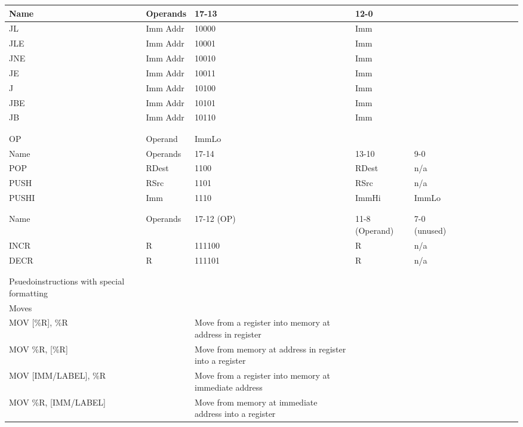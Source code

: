 \documentclass[a4paper]{article}
\begin{document}
\begin{tabular}{|l|l|l|l|l|l|l|l|l|l|l|l|}
\hline
Name&Operands&17-13&12-0&&&&&&
&&\\
\hline
{} JL&Imm Addr&10000&Imm&&&&&&
&&\\
\hline
JLE&Imm Addr&10001&Imm&&&&&&
&&\\
\hline
{} JNE&Imm Addr&10010&Imm&&&&&&
&&\\
\hline
JE&Imm Addr&10011&Imm&&&&&&
&&\\
\hline
{} J&Imm Addr&10100&Imm&&&&&&
&&\\
\hline
JBE&Imm Addr&10101&Imm&&&&&&
&&\\
\hline
{} JB&Imm Addr&10110&Imm&&&&&&
&&\\
\hline
&&&&&&&&&
&&\\
\hline
{} &&&&&&&&&
&&\\
\hline
OP&Operand&ImmLo&&&&&&&
&&\\
\hline
{} Name&Operands&17-14&13-10&9-0&&&&&
&&\\
\hline
POP&RDest&1100&RDest&n/a&&&&&
&&\\
\hline
{} PUSH&RSrc&1101&RSrc&n/a&&&&&
&&\\
\hline
PUSHI&Imm&1110&ImmHi&ImmLo&&&&&
&&\\
\hline
{} &&&&&&&&&
&&\\
\hline
&&&&&&&&&
&&\\
\hline
{} Name&Operands&17-12 (OP)&11-8 (Operand)&7-0 (unused)&&&&&
&&\\
\hline
INCR&R&111100&R&n/a&&&&&
&&\\
\hline
{} DECR&R&111101&R&n/a&&&&&
&&\\
\hline
&&&&&&&&&
&&\\
\hline
{} &&&&&&&&&
&&\\
\hline
Psuedoinstructions with special formatting&&&&&&&&&
&&\\
\hline
{} Moves&&&&&&&&&
&&\\
\hline
MOV [\%R], \%R&&Move from a register into memory at address in register&&&&&&&
&&\\
\hline
{} MOV \%R, [\%R]&&Move from memory at address in register into a register&&&&&&&
&&\\
\hline
MOV [IMM/LABEL], \%R&&Move from a register into memory at immediate address&&&&&&&
&&\\
\hline
{} MOV \%R, [IMM/LABEL]&&Move from memory at immediate address into a register&&&&&&&
&&\\

\end{tabular}
\end{document}
